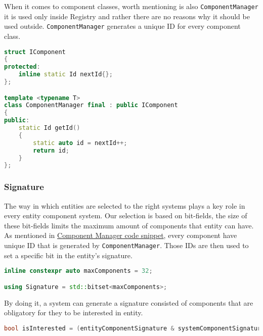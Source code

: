 When it comes to component classes, worth mentioning is also \texttt{ComponentManager}
it is used only inside Registry and rather there are no reasons why it should be used outside. \texttt{ComponentManager} generates a unique ID for every component class.
\label{lst:component_manager}
\begin{lstlisting}[language=c++, caption=IComponent and ComponentManager (./engine/include/tsengine/ecs/ecs.h)]
struct IComponent
{
protected:
    inline static Id nextId{};
};

template <typename T>
class ComponentManager final : public IComponent
{
public:
    static Id getId()
    {
        static auto id = nextId++;
        return id;
    }
};
\end{lstlisting}

\newpage

\subsubsection{Signature}
The way in which  entities are selected to the right systems plays a key role in every entity component system.
Our selection is based on bit-fields, the size of these bit-fields limits the maximum amount of components that entity can have.
As mentioned in \hyperref[lst:component_manager]{Component Manager code snippet}, every component have unique ID that is generated by \texttt{ComponentManager}. Those IDs are then used to set a specific bit in the entity's signature.
\begin{lstlisting}[language=c++, caption=Signature (./engine/include/tsengine/ecs/ecs.h)]
inline constexpr auto maxComponents = 32;

using Signature = std::bitset<maxComponents>;
\end{lstlisting}

By doing it, a system can generate a signature consisted of components that are obligatory for they to be interested in entity.
\begin{lstlisting}[language=c++, caption=Signature evaluation (./engine/include/tsengine/ecs/ecs.h)]
bool isInterested = (entityComponentSignature & systemComponentSignature) == systemComponentSignature;
\end{lstlisting}

\newpage

